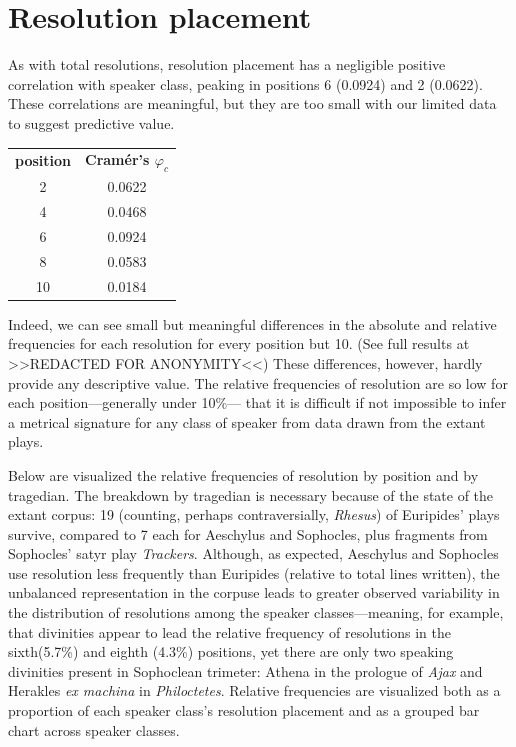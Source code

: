 \documentclass[
]{ceurart}
\begin{document}
\section{Resolution placement}

As with total resolutions, resolution placement has a negligible positive
correlation with speaker class, peaking in positions 6 (0.0924) and 2 (0.0622).
These correlations are meaningful, but they are too small with our limited data
to suggest predictive value.


\begin{center}
\begin{tabular}{c | c}
\textbf{position} & \textbf{Cramér's $φ_c$} \\
2 & 0.0622 \\
4 & 0.0468 \\
6 & 0.0924 \\
8 & 0.0583 \\
10 & 0.0184
\end{tabular}
\end{center}


Indeed, we can see small but meaningful differences in the absolute and
relative frequencies for each resolution for every position but 10. (See full
results at >>REDACTED FOR ANONYMITY<<) These differences, however, hardly provide any
descriptive value. The relative frequencies of resolution are so low for each
position---generally under 10\%--- that it is difficult if not impossible to
infer a metrical signature for any class of speaker from data drawn from the
extant plays.

Below are visualized the relative frequencies of resolution by position and by
tragedian. The breakdown by tragedian is necessary because of the state of
the extant corpus: 19 (counting, perhaps contraversially, \textit{Rhesus}) of
Euripides' plays survive, compared to 7 each for Aeschylus and Sophocles,
plus fragments from Sophocles' satyr play \textit{Trackers}. Although, as
expected, Aeschylus and Sophocles use resolution less frequently than
Euripides (relative to total lines written), the unbalanced representation in
the corpuse leads to greater observed variability in the distribution of
resolutions among the speaker classes---meaning, for example, that divinities
appear to lead the relative frequency of resolutions in the sixth(5.7\%) and
eighth (4.3\%) positions, yet there are only two speaking divinities present
in Sophoclean trimeter: Athena in the prologue of \textit{Ajax} and
Herakles \textit{ex machina} in \textit{Philoctetes}. Relative frequencies
are visualized both as a proportion of each speaker class's resolution
placement and as a grouped bar chart across speaker classes.
\end{document}
